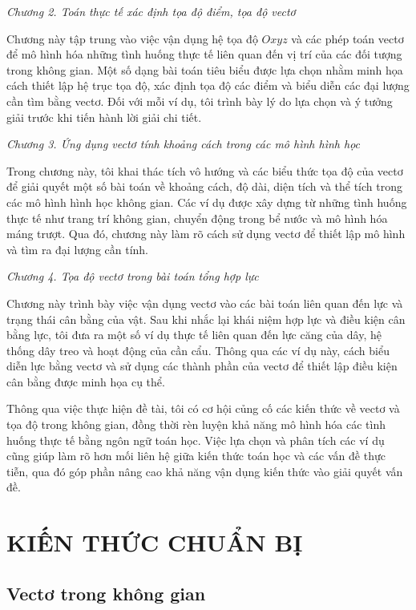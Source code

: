 \documentclass[12pt,a4paper,oneside]{book}
\theoremstyle{theorem}
\theoremstyle{definition}
\begin{document}
        \textit{Chương 2. Toán thực tế xác định tọa độ điểm, tọa độ vectơ}
        
        Chương này tập trung vào việc vận dụng hệ tọa độ $Oxyz$ và các phép toán vectơ để mô hình hóa những tình huống thực tế liên quan đến vị trí của các đối tượng trong không gian. Một số dạng bài toán tiêu biểu được lựa chọn nhằm minh họa cách thiết lập hệ trục tọa độ, xác định tọa độ các điểm và biểu diễn các đại lượng cần tìm bằng vectơ. Đối với mỗi ví dụ, tôi trình bày lý do lựa chọn và ý tưởng giải trước khi tiến hành lời giải chi tiết.
        
        \textit{Chương 3. Ứng dụng vectơ tính khoảng cách trong các mô hình hình học}
        
        Trong chương này, tôi khai thác tích vô hướng và các biểu thức tọa độ của vectơ để giải quyết một số bài toán về khoảng cách, độ dài, diện tích và thể tích trong các mô hình hình học không gian. Các ví dụ được xây dựng từ những tình huống thực tế như trang trí không gian, chuyển động trong bể nước và mô hình hóa máng trượt. Qua đó, chương này làm rõ cách sử dụng vectơ để thiết lập mô hình và tìm ra đại lượng cần tính.
        
        \textit{Chương 4. Tọa độ vectơ trong bài toán tổng hợp lực}
        
        Chương này trình bày việc vận dụng vectơ vào các bài toán liên quan đến lực và trạng thái cân bằng của vật. Sau khi nhắc lại khái niệm hợp lực và điều kiện cân bằng lực, tôi đưa ra một số ví dụ thực tế liên quan đến lực căng của dây, hệ thống dây treo và hoạt động của cần cẩu. Thông qua các ví dụ này, cách biểu diễn lực bằng vectơ và sử dụng các thành phần của vectơ để thiết lập điều kiện cân bằng được minh họa cụ thể.
        
        Thông qua việc thực hiện đề tài, tôi có cơ hội củng cố các kiến thức về vectơ và tọa độ trong không gian, đồng thời rèn luyện khả năng mô hình hóa các tình huống thực tế bằng ngôn ngữ toán học. Việc lựa chọn và phân tích các ví dụ cũng giúp làm rõ hơn mối liên hệ giữa kiến thức toán học và các vấn đề thực tiễn, qua đó góp phần nâng cao khả năng vận dụng kiến thức vào giải quyết vấn đề.
        
	
	
	
\chapter{KIẾN THỨC CHUẨN BỊ}
\section{Vectơ trong không gian}
\end{document}
